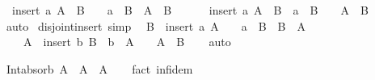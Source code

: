\begin{isabellebody}
\ \ {\isachardoublequoteopen}insert\ a\ A\ {\isasyminter}\ B\ {\isacharequal}{\kern0pt}\ {\isacharbraceleft}{\kern0pt}{\isacharbraceright}{\kern0pt}\ {\isasymlongleftrightarrow}\ a\ {\isasymnotin}\ B\ {\isasymand}\ A\ {\isasyminter}\ B\ {\isacharequal}{\kern0pt}\ {\isacharbraceleft}{\kern0pt}{\isacharbraceright}{\kern0pt}{\isachardoublequoteclose}\isanewline
\ \ {\isachardoublequoteopen}{\isacharbraceleft}{\kern0pt}{\isacharbraceright}{\kern0pt}\ {\isacharequal}{\kern0pt}\ insert\ a\ A\ {\isasyminter}\ B\ {\isasymlongleftrightarrow}\ a\ {\isasymnotin}\ B\ {\isasymand}\ {\isacharbraceleft}{\kern0pt}{\isacharbraceright}{\kern0pt}\ {\isacharequal}{\kern0pt}\ A\ {\isasyminter}\ B{\isachardoublequoteclose}\isanewline
%
\isadelimproof
\ \ %
\endisadelimproof
%
\isatagproof
{}\isamarkupfalse%
\ auto%
\endisatagproof
{\isafoldproof}%
%
\isadelimproof
\isanewline
%
\endisadelimproof
\isanewline
{}\isamarkupfalse%
\ disjoint{\isacharunderscore}{\kern0pt}insert\ {\isacharbrackleft}{\kern0pt}simp{\isacharbrackright}{\kern0pt}{\isacharcolon}{\kern0pt}\isanewline
\ \ {\isachardoublequoteopen}B\ {\isasyminter}\ insert\ a\ A\ {\isacharequal}{\kern0pt}\ {\isacharbraceleft}{\kern0pt}{\isacharbraceright}{\kern0pt}\ {\isasymlongleftrightarrow}\ a\ {\isasymnotin}\ B\ {\isasymand}\ B\ {\isasyminter}\ A\ {\isacharequal}{\kern0pt}\ {\isacharbraceleft}{\kern0pt}{\isacharbraceright}{\kern0pt}{\isachardoublequoteclose}\isanewline
\ \ {\isachardoublequoteopen}{\isacharbraceleft}{\kern0pt}{\isacharbraceright}{\kern0pt}\ {\isacharequal}{\kern0pt}\ A\ {\isasyminter}\ insert\ b\ B\ {\isasymlongleftrightarrow}\ b\ {\isasymnotin}\ A\ {\isasymand}\ {\isacharbraceleft}{\kern0pt}{\isacharbraceright}{\kern0pt}\ {\isacharequal}{\kern0pt}\ A\ {\isasyminter}\ B{\isachardoublequoteclose}\isanewline
%
\isadelimproof
\ \ %
\endisadelimproof
%
\isatagproof
{}\isamarkupfalse%
\ auto%
\endisatagproof
{\isafoldproof}%
%
\isadelimproof
%
\endisadelimproof
%
\begin{isamarkuptext}%
\medskip {}%
\end{isamarkuptext}\isamarkuptrue%
\isamarkupfalse%
\ Int{\isacharunderscore}{\kern0pt}absorb{\isacharcolon}{\kern0pt}\ {\isachardoublequoteopen}A\ {\isasyminter}\ A\ {\isacharequal}{\kern0pt}\ A{\isachardoublequoteclose}\isanewline
%
\isadelimproof
\ \ %
\endisadelimproof
%
\isatagproof
{}\isamarkupfalse%
\ {\isacharparenleft}{\kern0pt}fact\ inf{\isacharunderscore}{\kern0pt}idem{\isacharparenright}{\kern0pt}%
\endisatagproof
{\isafoldproof}%
%
\isadelimproof

\end{isabellebody}
